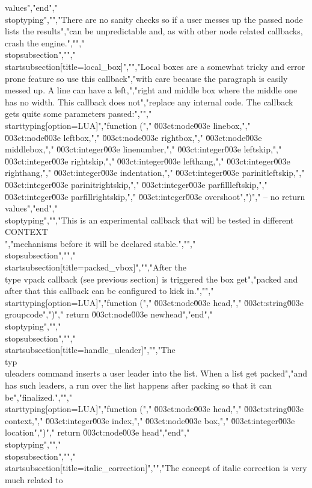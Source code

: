 values","end","\\stoptyping","","There are no sanity checks so if a user messes up the passed node lists the results","can be unpredictable and, as with other node related callbacks, crash the engine.","","\\stopsubsection","","\\startsubsection[title=local_box]","","Local boxes are a somewhat tricky and error prone feature so use this callback","with care because the paragraph is easily messed up. A line can have a left,","right and middle box where the middle one has no width. This callback does not","replace any internal code. The callback gets quite some parameters passed:","","\\starttyping[option=LUA]","function (","    \u003ct:node\u003e    linebox,","    \u003ct:node\u003e    leftbox,","    \u003ct:node\u003e    rightbox,","    \u003ct:node\u003e    middlebox,","    \u003ct:integer\u003e linenumber,","    \u003ct:integer\u003e leftskip,","    \u003ct:integer\u003e rightskip,","    \u003ct:integer\u003e lefthang,","    \u003ct:integer\u003e righthang,","    \u003ct:integer\u003e indentation,","    \u003ct:integer\u003e parinitleftskip,","    \u003ct:integer\u003e parinitrightskip,","    \u003ct:integer\u003e parfillleftskip,","    \u003ct:integer\u003e parfillrightskip,","    \u003ct:integer\u003e overshoot",")","    -- no return values","end","\\stoptyping","","This is an experimental callback that will be tested in different \\CONTEXT\\","mechanisms before it will be declared stable.","","\\stopsubsection","","\\startsubsection[title=packed_vbox]","","After the \\type {vpack} callback (see previous section) is triggered the box get","packed and after that this callback can be configured to kick in.","","\\starttyping[option=LUA]","function (","    \u003ct:node\u003e   head,","    \u003ct:string\u003e groupcode",")","    return \u003ct:node\u003e newhead","end","\\stoptyping","","\\stopsubsection","","\\startsubsection[title=handle_uleader]","","The \\typ {\\uleaders} command inserts a user leader into the list. When a list get packed","and has such leaders, a run over the list happens after packing so that it can be","finalized.","","\\starttyping[option=LUA]","function (","    \u003ct:node\u003e    head,","    \u003ct:string\u003e  context,","    \u003ct:integer\u003e index,","    \u003ct:node\u003e    box,","    \u003ct:integer\u003e location",")","    return \u003ct:node\u003e head","end","\\stoptyping","","\\stopsubsection","","\\startsubsection[title=italic_correction]","","The concept of italic correction is very much related to 